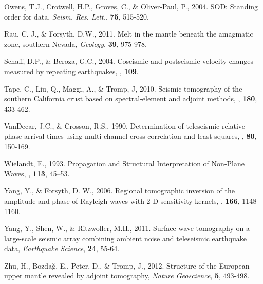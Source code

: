 \documentclass{gji}
\begin{document}
\begin{thebibliography}{}
	   Owens, T.J., Crotwell, H.P., Groves, C., \& Oliver-Paul, P., 2004. SOD: Standing order for data, \textit{Seism. Res. Lett.}, \textbf{75}, 515-520.

	   Rau, C. J., \& Forsyth, D.W., 2011. Melt in the mantle beneath the amagmatic zone, southern Nevada, \textit{Geology}, \textbf{39}, 975-978.

	   Schaff, D.P., \& Beroza, G.C., 2004. Coseismic and postseismic velocity changes measured by repeating earthquakes, \textit{\jgr}, \textbf{109}.

	   Tape, C., Liu, Q., Maggi, A., \& Tromp, J, 2010. Seismic tomography of the southern California crust based on spectral‐element and adjoint methods, \textit{\gji}, \textbf{180}, 433-462.

	   VanDecar, J.C., \& Crosson, R.S., 1990. Determination of teleseismic relative phase arrival times using multi-channel cross-correlation and least squares, \textit{\bssa}, \textbf{80}, 150-169.

	   Wielandt, E., 1993. Propagation and Structural Interpretation of Non‐Plane Waves, \textit{\gji}, \textbf{113}, 45–53.

	   Yang, Y., \& Forsyth, D. W., 2006. Regional tomographic inversion of the amplitude and phase of Rayleigh waves with 2-D sensitivity kernels, \textit{\gji}, \textbf{166}, 1148-1160.

	   Yang, Y., Shen, W., \& Ritzwoller, M.H., 2011. Surface wave tomography on a large-scale seismic array combining ambient noise and teleseismic earthquake data, \textit{Earthquake Science}, \textbf{24}, 55-64.

	   Zhu, H., Bozda\v{g}, E., Peter, D., \& Tromp, J., 2012. Structure of the European upper mantle revealed by adjoint tomography, \textit{Nature Geoscience}, \textbf{5}, 493-498.

\end{thebibliography}






\label{lastpage}
\end{document}
